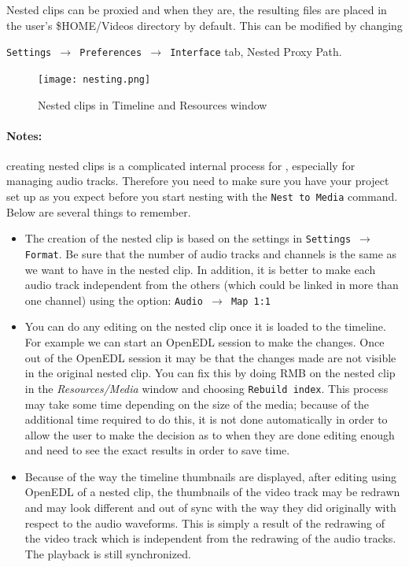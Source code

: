 Nested clips can be proxied and when they are, the resulting files
are placed in the user's \$HOME/Videos directory by default.  This
can be modified by changing

\texttt{Settings $\rightarrow$ Preferences $\rightarrow$ Interface}
tab, Nested Proxy Path.

\begin{figure}[htpb]
  \centering
  \texttt{[image: nesting.png]}
  \caption{Nested clips in Timeline and Resources window}
  \label{fig:nesting}
\end{figure}

\paragraph{Notes:} creating nested clips is a complicated internal process for \CGG{}, especially for managing audio tracks. Therefore you need to make sure you have your project set up as you expect before you start nesting with the \texttt{Nest to Media} command.  Below are several things to remember.

\begin{itemize}
	\item The creation of the nested clip is based on the settings in \texttt{Settings $\rightarrow$ Format}. Be sure that the number of audio tracks and channels is the same as we want to have in the nested clip. In addition, it is better to make each audio track independent from the others (which could be linked in more than one channel) using the option: \texttt{Audio $\rightarrow$ Map 1:1}
	\item You can do any editing on the nested clip once it is loaded to the timeline. For example we can start an OpenEDL session to make the changes. Once out of the OpenEDL session it may be that the changes made are not visible in the original nested clip. You can fix this by doing RMB on the nested clip in the \textit{Resources/Media} window and choosing \texttt{Rebuild index}. This process may take some time depending on the size of
the media; because of the additional time required to do this, it is not done automatically in order to allow
the user to make the decision as to when they are done editing enough and need to see the exact results
in order to save time.
	\item Because of the way the timeline thumbnails are displayed, after editing using OpenEDL of a
nested clip, the thumbnails of the video track may be redrawn and may look different and out of sync with the
way they did originally with respect to the audio waveforms. This is simply a result of the redrawing of the
 video track which is independent from the redrawing of the audio tracks. The playback is still synchronized.
\end{itemize}

